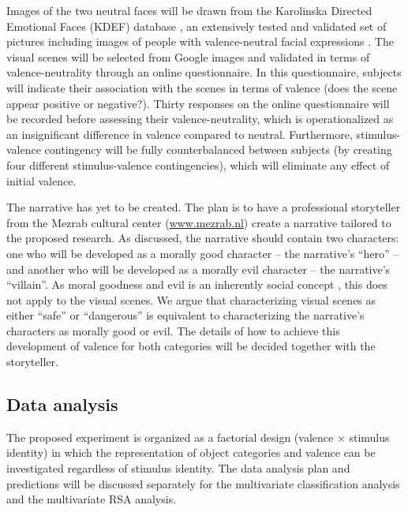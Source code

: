 \documentclass[12pt,a4paper]{article}\usepackage[]{graphicx}\usepackage[]{color}
\begin{document}
Images of the two neutral faces will be drawn from the Karolinska Directed Emotional Faces (KDEF) database \citep{KDEF}, an extensively tested and validated set of pictures including images of people with valence-neutral facial expressions \citep{goeleven2008}. The visual scenes will be selected from Google images and validated in terms of valence-neutrality through an online questionnaire. In this questionnaire, subjects will indicate their association with the scenes in terms of valence (does the scene appear positive or negative?). Thirty responses on the online questionnaire will be recorded before assessing their valence-neutrality, which is operationalized as an insignificant difference in valence compared to neutral. Furthermore, stimulus-valence contingency will be fully counterbalanced between subjects (by creating four different stimulus-valence contingencies), which will eliminate any effect of initial valence.

The narrative has yet to be created. The plan is to have a professional storyteller from the Mezrab cultural center (\url{www.mezrab.nl}) create a narrative tailored to the proposed research. As discussed, the narrative should contain two characters: one who will be developed as a morally good character -- the narrative's ``hero'' -- and another who will be developed as a morally evil character -- the narrative's ``villain''. As moral goodness and evil is an inherently social concept \citep{greene2002}, this does not apply to the visual scenes. We argue that characterizing visual scenes as either ``safe'' or ``dangerous'' is equivalent to characterizing the narrative's characters as morally good or evil. The details of how to achieve this development of valence for both categories will be decided together with the storyteller. 

\subsection{Data analysis}
The proposed experiment is organized as a factorial design (valence $\times$ stimulus identity) in which the representation of object categories and valence can be investigated regardless of stimulus identity. The data analysis plan and predictions will be discussed separately for the multivariate classification analysis and the multivariate RSA analysis.
\end{document}
